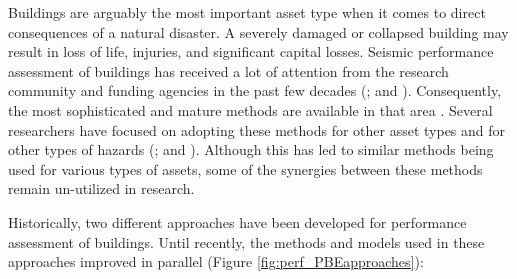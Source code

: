 Buildings are arguably the most important asset type when it comes to direct consequences of a natural disaster. A severely damaged or collapsed building may result in loss of life, injuries, and significant capital losses. Seismic performance assessment of buildings has received a lot of attention from the research community and funding agencies in the past few decades (\cite{atc1985atc13, fema1997guidelines, fajfar2004performancebased}; and \cite{kircher2006hazus}). Consequently, the most sophisticated and mature methods are available in that area \citep{atc2012p-58}. Several researchers have focused on adopting these methods for other asset types \citep{werner2006redars, chmielewski2016response} and for other types of hazards (\cite{vickery2006hazus, bernardini2015performance, attary2017performancebased, barbato2013performancebased}; and \cite{lange2014application}). Although this has led to similar methods being used for various types of assets, some of the synergies between these methods remain un-utilized in research.

Historically, two different approaches have been developed for performance assessment of buildings. Until recently, the methods and models used in these approaches improved in parallel (Figure \ref{fig:perf_PBEapproaches}):

